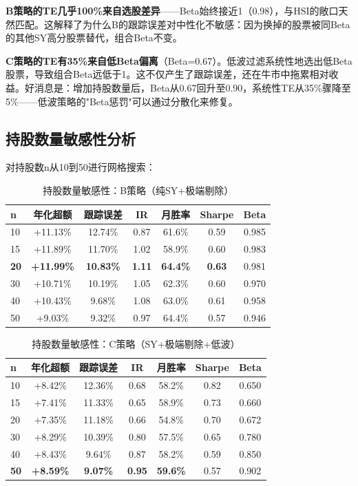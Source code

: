 \documentclass[10pt,a4paper]{ctexart}
\begin{document}
\textbf{B策略的TE几乎100\%来自选股差异}——Beta始终接近1（0.98），与HSI的敞口天然匹配。这解释了为什么B的跟踪误差对中性化不敏感：因为换掉的股票被同Beta的其他SY高分股票替代，组合Beta不变。

\textbf{C策略的TE有35\%来自低Beta偏离}（Beta=0.67）。低波过滤系统性地选出低Beta股票，导致组合Beta远低于1。这不仅产生了跟踪误差，还在牛市中拖累相对收益。好消息是：增加持股数量后，Beta从0.67回升至0.90，系统性TE从35\%骤降至5\%——低波策略的"Beta惩罚"可以通过分散化来修复。

\subsection{持股数量敏感性分析}

对持股数n从10到50进行网格搜索：

\begin{table}[htbp]
\centering
\caption{持股数量敏感性：B策略（纯SY+极端剔除）}
\begin{tabular}{lcccccc}
\toprule
\textbf{n} & \textbf{年化超额} & \textbf{跟踪误差} & \textbf{IR} & \textbf{月胜率} & \textbf{Sharpe} & \textbf{Beta} \\
\midrule
10 & +11.13\% & 12.74\% & 0.87 & 61.6\% & 0.59 & 0.985 \\
15 & +11.89\% & 11.70\% & 1.02 & 58.9\% & 0.60 & 0.983 \\
\textbf{20} & \textbf{+11.99\%} & \textbf{10.83\%} & \textbf{1.11} & \textbf{64.4\%} & \textbf{0.63} & 0.981 \\
30 & +10.71\% & 10.19\% & 1.05 & 62.3\% & 0.60 & 0.970 \\
40 & +10.43\% & 9.68\% & 1.08 & 63.0\% & 0.61 & 0.958 \\
50 & +9.03\% & 9.32\% & 0.97 & 64.4\% & 0.57 & 0.946 \\
\bottomrule
\end{tabular}
\end{table}

\begin{table}[htbp]
\centering
\caption{持股数量敏感性：C策略（SY+极端剔除+低波）}
\begin{tabular}{lcccccc}
\toprule
\textbf{n} & \textbf{年化超额} & \textbf{跟踪误差} & \textbf{IR} & \textbf{月胜率} & \textbf{Sharpe} & \textbf{Beta} \\
\midrule
10 & +8.42\% & 12.36\% & 0.68 & 58.2\% & 0.82 & 0.650 \\
15 & +7.41\% & 11.33\% & 0.65 & 58.9\% & 0.73 & 0.660 \\
20 & +7.35\% & 11.18\% & 0.66 & 54.8\% & 0.70 & 0.672 \\
30 & +8.29\% & 10.39\% & 0.80 & 57.5\% & 0.65 & 0.780 \\
40 & +8.43\% & 9.64\% & 0.87 & 58.2\% & 0.59 & 0.850 \\
\textbf{50} & \textbf{+8.59\%} & \textbf{9.07\%} & \textbf{0.95} & \textbf{59.6\%} & 0.57 & 0.902 \\
\bottomrule
\end{tabular}
\end{table}
\end{document}
